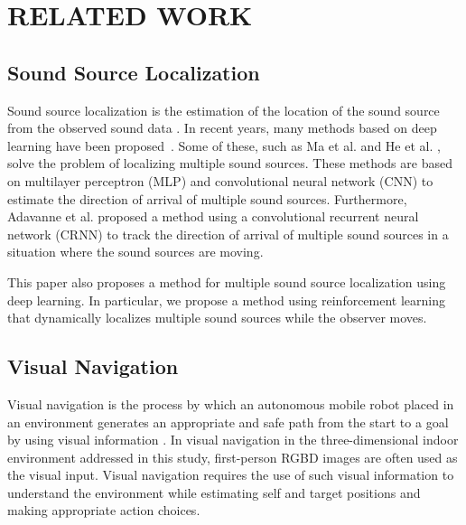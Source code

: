 \section{RELATED WORK}

\subsection{Sound Source Localization}

Sound source localization is the estimation of the location of the sound source from the observed sound data \cite{rascon2017localization}.
In recent years, many methods based on deep learning have been proposed~\cite{grumiaux2022survey,ma2015exploiting,he2018deep}.
Some of these, such as Ma et al. \cite{ma2015exploiting} and He et al. \cite{he2018deep}, solve the problem of localizing multiple sound sources.
These methods are based on multilayer perceptron (MLP) and convolutional neural network (CNN) to estimate the direction of arrival of multiple sound sources.
Furthermore, Adavanne et al. \cite{adavanne2019localization} proposed a method using a convolutional recurrent neural network (CRNN) to track the direction of arrival of multiple sound sources in a situation where the sound sources are moving.

This paper also proposes a method for multiple sound source localization using deep learning.
In particular, we propose a method using reinforcement learning that dynamically localizes multiple sound sources while the observer moves.


\subsection{Visual Navigation}

Visual navigation is the process by which an autonomous mobile robot placed in an environment generates an appropriate and safe path from the start to a goal by using visual information \cite{bonin2008visual}.
In visual navigation in the three-dimensional indoor environment addressed in this study, first-person RGBD images are often used as the visual input.
Visual navigation requires the use of such visual information to understand the environment while estimating self and target positions and making appropriate action choices.

